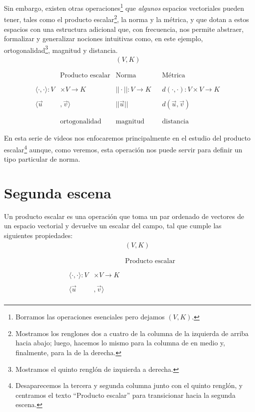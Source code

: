 \documentclass[12pt,dvipsnames]{article}
\numberwithin{equation}{section}
\begin{document}
Sin embargo, existen otras operaciones\footnote{Borramos las operaciones esenciales pero dejamos $(V,K)$.} que \emph{algunos} espacios vectoriales pueden tener, tales como el producto escalar\footnote{Mostramos los renglones dos a cuatro de la columna de la izquierda de arriba hacia abajo; luego, hacemos lo mismo para la columna de en medio y, finalmente, para la de la derecha.}, la norma y la métrica, y que dotan a estos espacios con una estructura adicional que, con frecuencia, nos permite abstraer, formalizar y generalizar nociones intuitivas como, en este ejemplo, ortogonalidad\footnote{Mostramos el quinto renglón de izquierda a derecha.}, magnitud y distancia.
\begin{align*}
    & &(V,K)& & \\
    \\
    \\
    &\text{Producto escalar} &\text{Norma}& &\text{Métrica}\\
    \\
    \\
    \langle\cdot,\cdot\rangle:V&\times V\to K &||\cdot||:V\to K& &d(\cdot,\cdot):V\times V\to K \\
    \\
    \langle\vec{u}&,\vec{v}\rangle &||\vec{u}||& &d(\vec{u},\vec{v})\\
    \\
    \\
    &\text{ortogonalidad} &\text{magnitud}& &\text{distancia}
\end{align*}

En esta serie de videos nos enfocaremos principalmente en el estudio del producto escalar\footnote{Desaparecemos la tercera y segunda columna junto con el quinto renglón, y centramos el texto ``Producto escalar'' para transicionar hacia la segunda escena.} aunque, como veremos, esta operación nos puede servir para definir un tipo particular de norma.


\newpage
\section{Segunda escena}

Un producto escalar es una operación que toma un par ordenado de vectores de un espacio vectorial y devuelve un escalar del campo, tal que cumple las siguientes propiedades:
\begin{align*}
    & &(V,K)& & \\
    \\
    \\
    & &\text{Producto escalar}& &\\
    \\
    \\
    \langle\cdot,\cdot\rangle:V&\times V\to K & &&\\
    \\
    \langle\vec{u}&,\vec{v}\rangle &\\
\end{align*}
\end{document}
